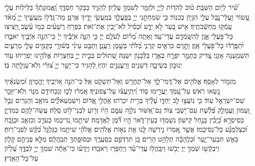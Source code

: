 \documentclass[twoside, openany, parskip=half, 11pt]{book}
\begin{document}
 


 
שִׁ֝֗יר לְי֥וֹם הַשַּׁבָּֽת׃
ט֗וֹב לְהֹד֥וֹת לַֽיְיָ֑ וּלְזַמֵּ֖ר לְשִׁמְךָ֣ עֶלְיֽוֹן׃ 
לְהַגִּ֣יד בַּבֹּ֣קֶר חַסְדֶּ֑ךָ וֶֽ֝אֱמוּנָֽתְֿךָ֗ בַּלֵּילֽוֹת׃ 
עֲלֵ֣י עָ֭שׂוֹר וַֽעֲלֵי־נָ֑בֶל עֲלֵ֖י הִגָּי֣וֹן בְּכִנּֽוֹר׃ 
כִּ֤י שִׂמַּחְתַּ֣נִי יְיָ֣ בְּפָֽעֳלֶ֑ךָ בְּמַֽעֲשֵׂ֖י יָדֶ֣יךָ אֲרַנֵּֽן׃ 
מַה־גָּֽדְֿל֣וּ מַֽעֲשֶׂ֣יךָ יְיָ֑ מְ֝אֹ֗ד עָֽמְֿק֥וּ מַחְשְֿׁבֹתֶֽיךָ׃ 
אִ֣ישׁ בַּ֭עַר לֹ֣א יֵדָ֑ע וּ֝כְסִ֗יל לֹֽא־יָבִ֥ין אֶת־זֹֽאת׃ 
בִּפְרֹ֤חַ רְשָׁעִ֨ים כְּמ֥וֹ עֵ֗שֶׂב וַ֭יָּצִיצוּ כָּל־פֹּ֣עֲלֵי אָ֑וֶן לְהִשָּֽׁמְֿדָ֥ם עֲדֵי־עַֽד׃ 
וְאַתָּ֥ה מָ֝ר֗וֹם לְעֹלָ֥ם יְיָ׃ 
כִּ֤י הִנֵּ֢ה אֹֽיְֿבֶ֡יךָ יְיָ֗ כִּֽי־ֹהִנֵּ֣ה אֹֽיְֿבֶ֣יךָ יֹאבֵ֑דוּ יִ֝תְפָּֽרְֿד֗וּ כָּל־פֹּ֥עֲלֵי אָֽוֶן׃ 
וַתָּ֣רֶם כִּרְאֵ֣ים קַרְנִ֑י בַּ֝לֹּתִ֗י בְּשֶׁ֣מֶן רַֽעֲנָֽן׃ 
וַתַּבֵּ֥ט עֵינִ֗י בְּשׁ֫וּרָ֥י בַּקָּמִ֣ים עָלַ֣י מְרֵעִ֑ים תִּשְׁמַ֥עְנָה אָזְנָֽי׃ 
צַ֭דִּיק כַּתָּמָ֣ר יִפְרָ֑ח כְּאֶ֖רֶז בַּלְּֿבָנ֣וֹן יִשְׂגֶּֽה׃ 
שְׁ֭תוּלִים בְּבֵ֣ית יְיָ֑ בְּחַצְר֖וֹת אֱלֹהֵ֣ינוּ יַפְרִֽיחוּ׃ 
ע֖וֹד יְנוּב֣וּן בְּשֵׂיבָ֑ה דְּשֵׁנִ֖ים וְרַֽעֲנַנִּ֣ים יִהְיֽוּ׃ 
לְ֭הַגִּיד כִּי־יָשָׁ֣ר יְיָ֑ צ֝וּרִ֗י וְלֹֽא־עַוְלָ֥תָה בּֽוֹ׃


מִזְמ֣וֹר לְאָסָֽף׃ אֱלֹהִ֥ים אַל־דֳּמִי־לָ֑ךְ אַל־תֶּחֱרַ֖שׁ וְאַל־תִּשְׁקֹ֣ט אֵֽל׃ כִּי־הִנֵּ֣ה אֽ֭וֹיְבֶיךָ יֶֽהֱמָיוּ֑ן וּ֝מְשַׂנְאֶ֗יךָ נָ֣שְׂאוּ רֹֽאשׁ׃ עַל־עַ֭מְּךָ יַֽעֲרִ֣ימוּ ס֑וֹד וְ֝יִֽתְיָֽעֲצ֗וּ עַל־צְפוּנֶֽיךָ׃ אָֽמְר֗וּ לְכ֣וּ וְנַכְחִידֵ֣ם מִגּ֑וֹי וְלֹֽא־יִזָּכֵ֖ר שֵׁם־יִשְׂרָאֵ֣ל עֽוֹד׃ כִּ֤י נֽוֹעֲצ֣וּ לֵ֣ב יַחְדָּ֑ו עָ֝לֶ֗יךָ בְּרִ֣ית יִכְרֹֽתוּ׃ אָֽהֳלֵ֣י אֱ֭דוֹם וְיִשְׁמְעֵאלִ֑֗ים מוֹאָ֥ב וְהַגְרִֽים׃ גְּבָ֣ל וְ֭עַמּוֹן וַֽעֲמָלֵ֑ק פְּ֝לֶ֗שֶׁת עִם־י֥שְׁבֵי צֽוֹר׃ גַּם־אַ֭שּׁוּר נִלְוָ֣ה עִמָּ֑ם הָי֙וּ זְר֖וֹעַ לִבְנֵי־ל֣וֹט סֶֽלָה׃ עֲשֵׂה־לָהֶ֥ם כְּמִדְיָ֑ן כְּסִֽיסְרָ֥א כְ֝יָבִ֗ין בְּנַ֣חַל קִישֽׁוֹן׃ נִשְׁמְד֥וּ בְעֵין־דֹּ֑אר הָ֥יוּ דֹּ֝֗מֶן לַֽאֲדָמָֽה׃ שִׁיתֵ֣מוֹ נְ֭דִיבֵמוֹ כְּעֹרֵ֣ב וְכִזְאֵ֑ב וּכְזֶ֥בַח וּ֝כְצַלְמֻנָּ֗ע כָּל־נְסִיכֵֽמוֹ׃ אֲשֶׁ֣ר אָֽ֭מְרוּ נִ֣ירְשָׁה לָּ֑נוּ אֵ֖ת נְא֣וֹת אֱלֹהִֽים׃ אֱלֹהַ֗י שִׁיתֵ֥מוֹ כַגַּלְגַּ֑ל כְּ֝קַ֗שׁ לִפְנֵי־רֽוּחַ׃ כְּאֵ֥שׁ תִּבְעַר־יָ֑עַר וּ֝כְלֶֽהָבָ֗ה תְּלַהֵ֥ט הָרִֽים׃  כֵּ֭ן תִּרְדְּפֵ֣ם בְּסַֽעֲרֶ֑ךָ וּבְסוּפָֽתְךָ֥ תְבַֽהֲלֵֽם׃ מַלֵּ֣א פְנֵיהֶ֣ם קָל֑וֹן וִֽיבַקְֿשׁ֖וּ שִׁמְךָ֣ יְיָ׃ יֵבֹ֖שׁוּ וְיִבָּֽהֲל֥וּ עֲדֵי־עַ֗ד וְיַחְפְּר֥וּ וְיֹאבֵֽדוּ׃ וְיֵֽדְע֗וּ כִּי־אַתָּ֬ה שִׁמְךָ֣ יְיָ֣ לְבַדֶּ֑ךָ עֶ֝לְי֗וֹן עַל־כָּל־הָאָֽרֶץ׃

\mournerskaddish

\birkashabonim
\end{document}
